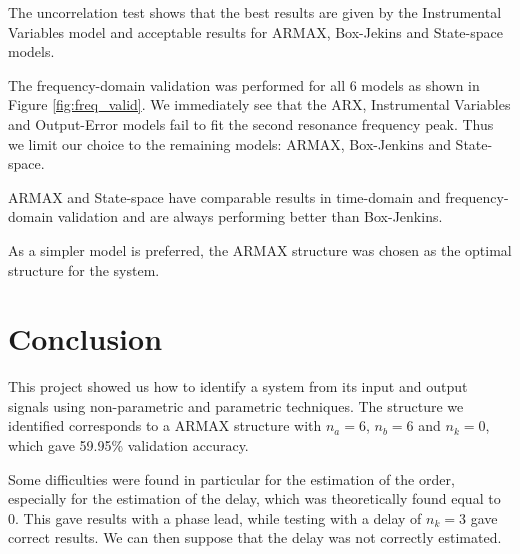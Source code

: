 \documentclass[a4paper,11pt]{article}
\begin{document}
The uncorrelation test shows that the best results are given by the Instrumental Variables model and acceptable results for ARMAX, Box-Jekins and State-space models.

The frequency-domain validation was performed for all 6 models as shown in Figure \ref{fig:freq_valid}. We immediately see that the ARX, Instrumental Variables and Output-Error models fail to fit the second resonance frequency peak. Thus we limit our choice to the remaining models: ARMAX, Box-Jenkins and State-space.

ARMAX and State-space have comparable results in time-domain and frequency-domain validation and are always performing better than Box-Jenkins.

As a simpler model is preferred, the ARMAX structure was chosen as the optimal structure for the system.



\section{Conclusion}
This project showed us how to identify a system from its input and output signals using non-parametric and parametric techniques. 
The structure we identified corresponds to a ARMAX structure with $n_a = 6$, $n_b = 6$ and $n_k = 0$, which gave 59.95\% validation accuracy.

Some difficulties were found in particular for the estimation of the order, especially for the estimation of the delay, which was theoretically found equal to 0. This gave results with a phase lead, while testing with a delay of $n_k = 3$ gave correct results. We can then suppose that the delay was not correctly estimated.
\end{document}
